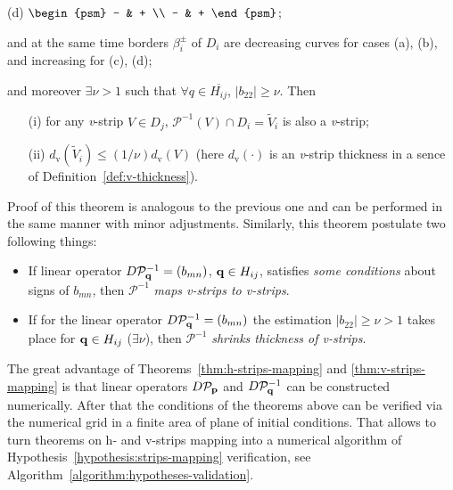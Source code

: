 \begin{theorem}
\begin{enumerate}
\begin{center}
				(d) $\begin{psm} - & + \\ - & + \end{psm}$;		
			\end{center}
			and at the same time borders $\beta_i^{\pm}$ of $D_i$ are decreasing curves for cases (a), (b), and increasing for (c), (d);
	\end{enumerate}
	and moreover $\exists \nu > 1$ such that $\forall q \in \overline{H_{ij}}$, $|b_{22}| \ge \nu$.
	Then
	\begin{itemize}
		\item[(i)] for any \emph{v}-strip $V \in D_j$, $\mathcal{P}^{-1} (V) \cap D_i = \widetilde{V}_i$ is also a \emph{v}-strip;
		\item[(ii)] $d_{\mathrm{v}} (\widetilde{V}_i) \le (1 / \nu) d_{\mathrm{v}} (V)$ (here $d_{\mathrm{v}}(\cdot)$ is an \emph{v}-strip thickness in a sence of Definition~\ref{def:v-thickness}).
	\end{itemize}
\end{theorem}
Proof of this theorem is analogous to the previous one and can be performed in the same manner with minor adjustments.
Similarly, this theorem postulate two following things:
\begin{itemize}
	\item If linear operator $D \mathcal{P}_{\vb{q}}^{-1} = (b_{mn})$, $\vb{q} \in H_{ij}$, satisfies {\it some conditions} about signs of $b_{mn}$, then $\mathcal{P}^{-1}$ {\it maps v-strips to v-strips}.
	\item If for the linear operator $D \mathcal{P}_{\vb{q}}^{-1} = (b_{mn})$ the estimation $|b_{22}| \ge \nu > 1$ takes place for $\vb{q} \in H_{ij}$ ($\exists \nu$), then $\mathcal{P}^{-1}$ {\it shrinks thickness of v-strips}.
\end{itemize}

The great advantage of Theorems~\ref{thm:h-strips-mapping} and \ref{thm:v-strips-mapping} is that linear operators $D \mathcal{P}_{\vb{p}}$ and $D \mathcal{P}_{\vb{q}}^{-1}$ can be constructed numerically.
After that the conditions of the theorems above can be verified via the numerical grid in a finite area of plane of initial conditions.
That allows to turn theorems on h- and v-strips mapping into a numerical algorithm of Hypothesis~\ref{hypothesis:strips-mapping} verification, see Algorithm~\ref{algorithm:hypotheses-validation}.


